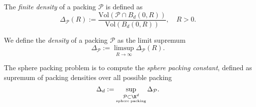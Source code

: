 \begin{definition}\label{SpherePacking.FiniteDensity}\leanok
  The \emph{finite density} of a packing $\mathcal{P}$ is defined as
$$\Delta_{\mathcal{P}}(R):=\frac{\mathrm{Vol}(\mathcal{P}\cap B_d(0,R))}{\mathrm{Vol}(B_d(0,R))},\quad R>0.$$
\end{definition}

\begin{definition}\label{SpherePacking.Density}\leanok
  We define the \emph{density} of a packing $\mathcal{P}$ as the limit supremum
$$\Delta_{\mathcal{P}}:=\limsup\limits_{R\to\infty}\Delta_{\mathcal{P}}(R). $$
\end{definition}

\begin{definition}\label{SpherePacking.Constant}\leanok
  The sphere packing problem is to compute the \emph{sphere packing constant}, defined as supremum of packing densities over all possible packing
$$\Delta_d:=\sup\limits_{\substack{\mathcal{P}\subset\R^d\\ \scriptscriptstyle\mathrm{sphere}\;\mathrm{packing}}}\Delta_{\mathcal{P}}.$$
\end{definition}
